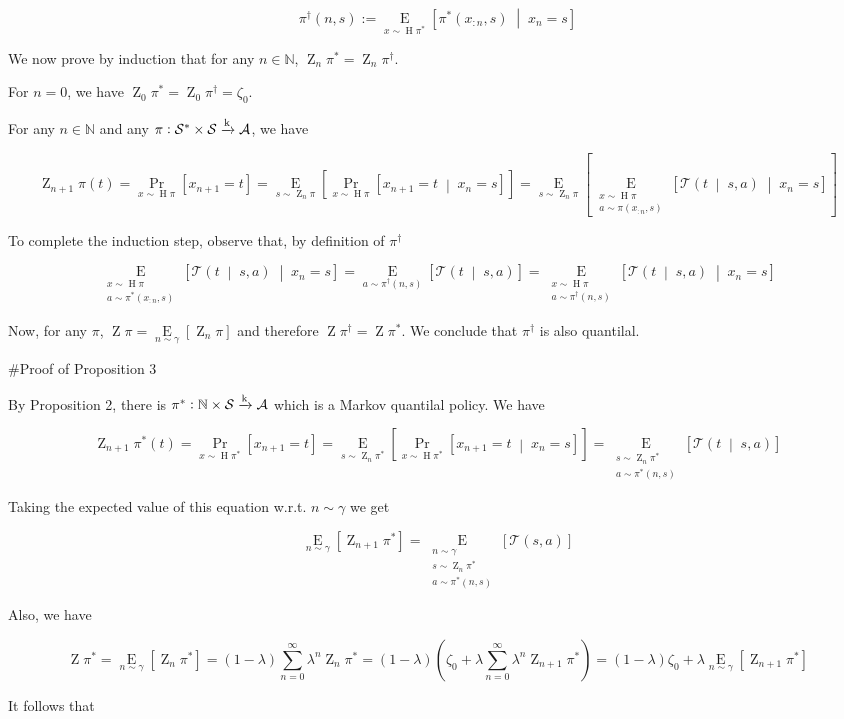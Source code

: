 \documentclass[a4paper]{article}
\newcommand{\AP}[1]{\left(#1\right)}
\newcommand{\AB}[1]{\left[#1\right]}
\newcommand{\APM}[2]{\left(#1\;\middle\vert\;#2\right)}
\newcommand{\ABM}[2]{\left[#1\;\middle\vert\;#2\right]}
\newcommand{\Pa}[2]{\underset{#1}{\operatorname{Pr}}\AB{#2}}
\newcommand{\CP}[3]{\underset{#1}{\operatorname{Pr}}\ABM{#2}{#3}}
\newcommand{\Ea}[2]{\underset{#1}{\operatorname{E}}\AB{#2}}
\newcommand{\CE}[3]{\underset{#1}{\operatorname{E}}\ABM{#2}{#3}}
\newcommand{\Nats}{\mathbb{N}}
\newcommand{\K}{\xrightarrow{\textnormal{k}}}
\newcommand{\A}{\mathcal{A}}
\newcommand{\St}{\mathcal{S}}
\newcommand{\T}{\mathcal{T}}
\DeclareMathOperator{\Hi}{H}
\DeclareMathOperator{\Z}{Z}
\begin{document}
$$\pi^\dagger(n,s):=\CE{x\sim\Hi{\pi^*}}{\pi^*(x_{:n},s)}{x_n=s}$$

We now prove by induction that for any $n\in\Nats$, $\Z_n{\pi^*} = \Z_n{\pi^\dagger}$.

For $n=0$, we have $\Z_0{\pi^*} = \Z_0{\pi^\dagger} = \zeta_0$.

For any $n \in \Nats$ and any $\pi: \St^* \times \St \K \A$, we have

$$\Z_{n+1}{\pi}(t) = \Pa{x\sim\Hi{\pi}}{x_{n+1}=t} = \Ea{s\sim\Z_n{\pi}}{\CP{x\sim\Hi{\pi}}{x_{n+1} = t}{x_n=s}} = \Ea{s\sim\Z_n{\pi}}{\CE{\substack{x\sim\Hi{\pi} \\ a\sim\pi\AP{x_{:n},s}}}{\T\APM{t}{s,a}}{x_n=s}}$$

To complete the induction step, observe that, by definition of $\pi^\dagger$


$$\CE{\substack{x\sim\Hi{\pi} \\ a\sim\pi^*\AP{x_{:n},s}}}{\T\APM{t}{s,a}}{x_n=s} = \Ea{a\sim\pi^\dagger\AP{n,s}}{\T\APM{t}{s,a}}=\CE{\substack{x\sim\Hi{\pi} \\ a\sim\pi^\dagger\AP{n,s}}}{\T\APM{t}{s,a}}{x_n=s}$$

Now, for any $\pi$, $\Z{\pi}=\Ea{n\sim\gamma}{\Z_n{\pi}}$ and therefore $\Z{\pi^\dagger} = \Z{\pi^*}$. We conclude that $\pi^\dagger$ is also quantilal.

\#Proof of Proposition 3

By Proposition 2, there is $\pi^*: \Nats \times \St \K \A$ which is a Markov quantilal policy. We have

$$\Z_{n+1}{\pi^*}(t) = \Pa{x\sim\Hi{\pi^*}}{x_{n+1}=t} = \Ea{s\sim\Z_n{\pi^*}}{\CP{x\sim\Hi{\pi^*}}{x_{n+1} = t}{x_n=s}} = \Ea{\substack{s\sim\Z_n{\pi^*}\\a\sim\pi^*\AP{n,s}}}{\T\APM{t}{s,a}}$$

Taking the expected value of this equation w.r.t. $n\sim\gamma$ we get

$$\Ea{n\sim\gamma}{\Z_{n+1}{\pi^*}} = \Ea{\substack{n\sim\gamma\\s\sim\Z_n{\pi^*}\\a\sim\pi^*\AP{n,s}}}{\T(s,a)}$$

Also, we have

$$\Z\pi^* = \Ea{n\sim\gamma}{\Z_n \pi^*} = (1-\lambda)\sum_{n=0}^\infty \lambda^n \Z_n \pi^* = (1-\lambda)\AP{\zeta_0 + \lambda \sum_{n=0}^\infty \lambda^n \Z_{n+1}\pi^*}=(1-\lambda)\zeta_0 + \lambda \Ea{n\sim\gamma}{\Z_{n+1}{\pi^*}}$$

It follows that
\end{document}
